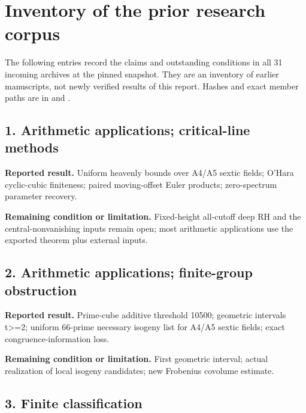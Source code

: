 \section{Inventory of the prior research corpus}

\label{sec:prior-catalog}

The following entries record the claims and outstanding conditions in all 31 incoming archives at the pinned snapshot. They are an inventory of earlier manuscripts, not newly verified results of this report. Hashes and exact member paths are in  and .

\small

\subsection*{1. Arithmetic applications; critical-line methods}

\href{https://github.com/VladimirReshetnikov/ProveIt/blob/274841c1cb137aafbb60ab5f519c51fd42eee98e/docs/incoming/dirichlet-grh-research.zip}{}

\textbf{Reported result.} Uniform heavenly bounds over A4/A5 sextic fields; O'Hara cyclic-cubic finiteness; paired moving-offset Euler products; zero-spectrum parameter recovery.

\textbf{Remaining condition or limitation.} Fixed-height all-cutoff deep RH and the central-nonvanishing inputs remain open; most arithmetic applications use the exported theorem plus external inputs.

\subsection*{2. Arithmetic applications; finite-group obstruction}

\href{https://github.com/VladimirReshetnikov/ProveIt/blob/274841c1cb137aafbb60ab5f519c51fd42eee98e/docs/incoming/grh-arithmetic-transfers.zip}{}

\textbf{Reported result.} Prime-cube additive threshold 10500; geometric intervals t>=2; uniform 66-prime necessary isogeny list for A4/A5 sextic fields; exact congruence-information loss.

\textbf{Remaining condition or limitation.} First geometric interval; actual realization of local isogeny candidates; new Frobenius covolume estimate.

\subsection*{3. Finite classification}

